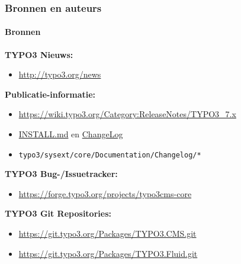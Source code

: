 \begin{frame}[fragile]
	\frametitle{Bronnen en auteurs}
	\framesubtitle{Bronnen}

	\textbf{TYPO3 Nieuws:}
		\begin{itemize}\smaller
			\item \url{http://typo3.org/news}
		\end{itemize}

	\textbf{Publicatie-informatie:}
		\begin{itemize}\smaller
			\item \url{https://wiki.typo3.org/Category:ReleaseNotes/TYPO3_7.x}
			\item \href{https://github.com/TYPO3/TYPO3.CMS/blob/master/INSTALL.md}{INSTALL.md} en \href{https://github.com/TYPO3/TYPO3.CMS/blob/master/ChangeLog}{ChangeLog}
			\item \texttt{typo3/sysext/core/Documentation/Changelog/*}
		\end{itemize}

	\textbf{TYPO3 Bug-/Issuetracker:}
		\begin{itemize}\smaller
			\item \url{https://forge.typo3.org/projects/typo3cms-core}
		\end{itemize}

	\textbf{TYPO3 Git Repositories:}
		\begin{itemize}\smaller
			\item \url{https://git.typo3.org/Packages/TYPO3.CMS.git}
			\item \url{https://git.typo3.org/Packages/TYPO3.Fluid.git}
		\end{itemize}

\end{frame}


